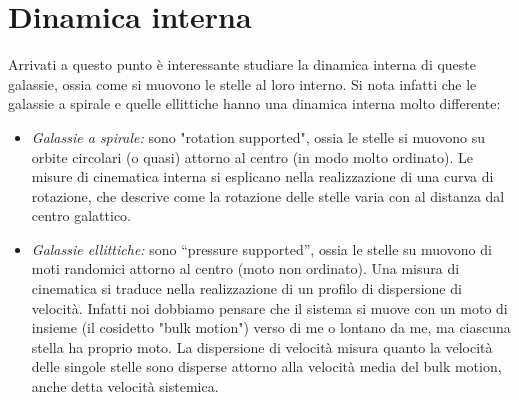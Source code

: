 \section{Dinamica interna}
Arrivati a questo punto è interessante studiare la dinamica interna di queste galassie, ossia come si muovono le stelle al loro interno. Si nota infatti che le galassie a spirale e quelle ellittiche hanno una dinamica interna molto differente:

\begin{itemize}
    \item \emph{Galassie a spirale:} sono "rotation supported", ossia le stelle si muovono su orbite circolari (o quasi) attorno al centro (in modo molto ordinato). Le misure di cinematica interna si esplicano nella realizzazione di una curva di rotazione, che descrive come la rotazione delle stelle varia con al distanza dal centro galattico.
    \item \emph{Galassie ellittiche:} sono “pressure supported”, ossia le stelle su muovono di moti randomici attorno al centro (moto non ordinato). Una misura di cinematica si traduce nella realizzazione di un profilo di dispersione di velocità. Infatti noi dobbiamo pensare che il sistema si muove con un moto di insieme (il cosidetto "bulk motion") verso di me o lontano da me, ma ciascuna stella ha proprio moto. La dispersione di velocità misura quanto la velocità delle singole stelle sono disperse attorno alla velocità media del bulk motion, anche detta velocità sistemica.
\end{itemize} 

